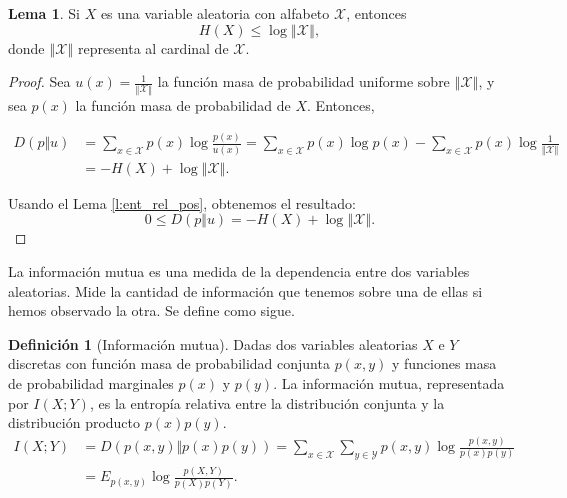 \documentclass[10pt,a4paper]{article} %
\theoremstyle{definition}
\newtheorem{definition}{Definición}[section]
\newtheorem{lemma}[theorem]{Lema}
\begin{document}
\begin{lemma}
  Si $X$ es una variable aleatoria con alfabeto $\mathcal{X}$, entonces \[
  H(X) \leq \log{\left\Vert\mathcal{X}\right\Vert}, 
  \]
donde $\left\Vert\mathcal{X}\right\Vert$ representa al cardinal de $\mathcal{X}$.
\end{lemma}
\begin{proof}
  Sea $u(x) = \frac{1}{\left\Vert\mathcal{X}\right\Vert}$ la función masa de probabilidad uniforme sobre $\left\Vert\mathcal{X}\right\Vert$, y sea $p(x)$ la función masa de probabilidad de $X$. Entonces,
  
 \begin{align*}
   D \left ( p \Vert u \right ) &= \sum_{x \in \mathcal{X}}
   p(x) \log \frac{p(x)}{u(x)} = \sum_{x \in \mathcal{X}} p(x) \log p(x) - \sum_{x \in \mathcal{X}} p(x) \log \frac{1}{\left\Vert\mathcal{X}\right\Vert}\\
  &= -H(X) + \log \left\Vert\mathcal{X}\right\Vert.
 \end{align*}
 
    Usando el Lema \ref{l:ent_rel_pos}, obtenemos el resultado: \[
0 \leq D\left ( p \Vert u \right ) = -H(X) + \log \left\Vert\mathcal{X}\right\Vert.
    \]
\end{proof}


La información mutua es una medida de la dependencia entre dos variables aleatorias. Mide la cantidad de información que tenemos sobre una de ellas si hemos observado la otra. Se define como sigue.

\begin{definition}[Información mutua]
  Dadas dos variables aleatorias $X$ e $Y$ discretas con función masa de probabilidad conjunta $p(x,y)$ y funciones masa de probabilidad marginales $p(x)$ y $p(y)$. La información mutua, representada por $I(X;Y)$, es la entropía relativa entre la distribución conjunta y la distribución producto $p(x)p(y)$.
  \begin{align*}
  I(X;Y) &= D \left ( p(x,y) \Vert p(x)p(y) \right ) = \sum_{x \in \mathcal{X}}\sum_{y \in \mathcal{Y}} p(x,y) \log \frac{p(x,y)}{p(x)p(y)}\\ &= E_{p(x,y)} \log \frac{p(X,Y)}{p(X)p(Y)}.
  \end{align*}
\end{definition}
\end{document}
